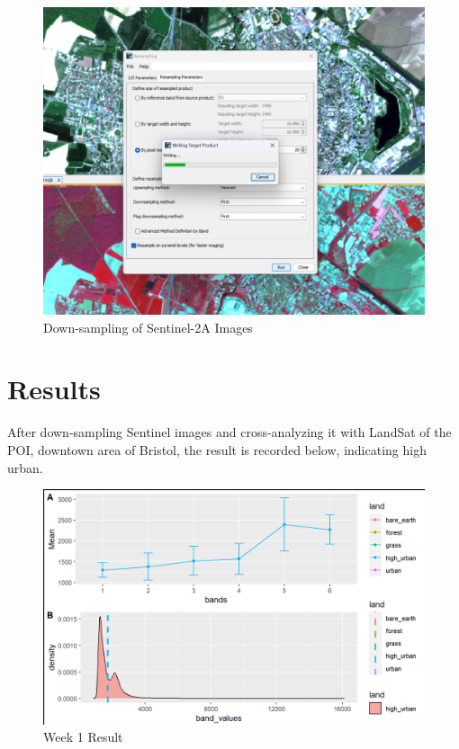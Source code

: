 \documentclass[
  letterpaper,
  DIV=11,
  numbers=noendperiod]{scrreprt}
\begin{document}
\begin{figure}

{\centering \includegraphics[width=5.15625in,height=\textheight]{images/wk1/resampling.png}

}

\caption{Down-sampling of Sentinel-2A Images}

\end{figure}

\hypertarget{results}{%
\section*{Results}\label{results}}


After down-sampling Sentinel images and cross-analyzing it with LandSat
of the POI, downtown area of Bristol, the result is recorded below,
indicating high urban.

\begin{figure}

{\centering \includegraphics[width=6.73958in,height=\textheight]{images/wk1/Screenshot 2024-01-29 202650.png}

}

\caption{Week 1 Result}

\end{figure}
\end{document}
